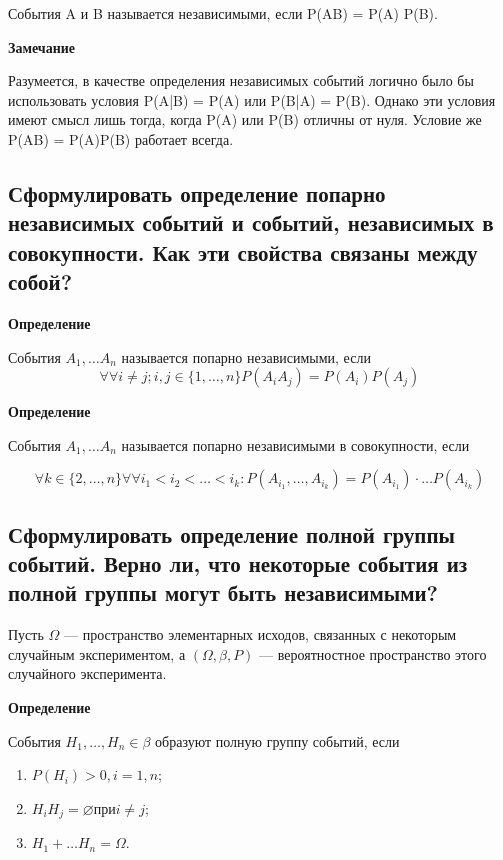 События A и B называется независимыми, если P(AB) = P(A) P(B).

\textbf{Замечание}

Разумеется, в качестве определения независимых событий логично было бы использовать условия P(A|B) = P(A) или P(B|A) = P(B). Однако эти условия имеют смысл лишь тогда, когда P(A) или P(B) отличны от нуля. Условие же P(AB) = P(A)P(B) работает всегда.

\subsection{Сформулировать определение попарно независимых событий и событий, независимых в совокупности. Как эти свойства связаны между собой?}

\textbf{Определение}

События $A_1, \dots A_n$ называется попарно независимыми, если
\begin{equation}
	\forall \forall i \neq j; i,j \in \{1, \dots, n\} P(A_i A_j) = P(A_i)P(A_j)
\end{equation}


\textbf{Определение}

События $A_1, \dots A_n$ называется попарно независимыми в совокупности, если

\begin{equation}
	\forall k \in \{2, \dots, n\} \forall \forall i_1 < i_2 < \dots < i_k: P(A_{i_1}, \dots, A_{i_k}) = P(A_{i_1}) \cdot \dots P(A_{i_k})
\end{equation}


\subsection{Сформулировать определение полной группы событий. Верно ли, что некоторые события из полной группы могут быть независимыми?}

Пусть $\Omega$ --- пространство элементарных исходов, связанных с некоторым случайным экспериментом, а $(\Omega, \beta, P)$ --- вероятностное пространство этого случайного эксперимента.

\textbf{Определение}

События $H_1, \dots, H_n \in \beta$ образуют полную группу событий, если

\begin{enumerate}
	\item $P(H_i) > 0, i = 1, n$;
	\item $H_iH_j = \varnothing при i \neq j$;
	\item $H_1 + \dots H_n = \Omega$.
\end{enumerate}

